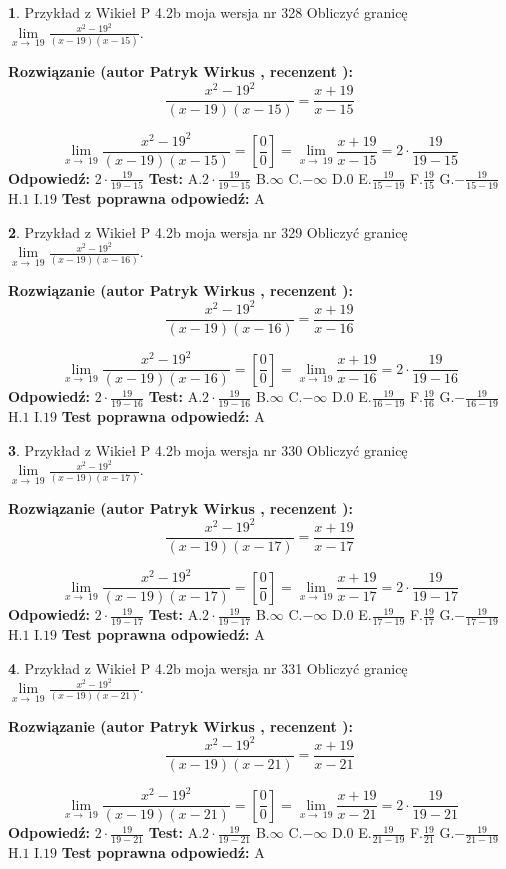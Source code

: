 \documentclass[12pt, a4paper]{article}
\theoremstyle{definition} %
\newtheorem{zad}{}
\newcommand{\zadStart}[1]{\begin{zad}#1\newline}
\newcommand{\zadStop}{\end{zad}}
\newcommand{\rozwStart}[2]{\noindent \textbf{Rozwiązanie (autor #1 , recenzent #2): }\newline}
\newcommand{\rozwStop}{\newline}
\newcommand{\odpStart}{\noindent \textbf{Odpowiedź:}\newline}
\newcommand{\odpStop}{\newline}
\newcommand{\testStart}{\noindent \textbf{Test:}\newline}
\newcommand{\testStop}{\newline}
\newcommand{\kluczStart}{\noindent \textbf{Test poprawna odpowiedź:}\newline}
\newcommand{\kluczStop}{\newline}
\begin{document}
\zadStart{Przykład z Wikieł P 4.2b moja wersja nr 328}
Obliczyć granicę $\lim\limits_{x\to\ 19}\frac{x^{2}-19^{2}}{(x-19)(x-15)}$.
\zadStop
\rozwStart{Patryk Wirkus}{}
$$\frac{x^{2}-19^{2}}{(x-19)(x-15)}=\frac{x+19}{x-15}$$

$$\lim\limits_{x\to\ 19}\frac{x^{2}-19^{2}}{(x-19)(x-15)}=[\frac{0}{0}]=\lim\limits_{x\to\ 19}\frac{x+19}{x-15}=2 \cdot \frac{19}{19-15}$$
\rozwStop
\odpStart
$2 \cdot \frac{19}{19-15}$
\odpStop
\testStart
A.$2 \cdot \frac{19}{19-15}$
B.$\infty$
C.$-\infty$
D.$0$
E.$\frac{19}{15-19}$
F.$\frac{19}{15}$
G.$-\frac{19}{15-19}$
H.$1$
I.$19$
\testStop
\kluczStart
A
\kluczStop



\zadStart{Przykład z Wikieł P 4.2b moja wersja nr 329}
Obliczyć granicę $\lim\limits_{x\to\ 19}\frac{x^{2}-19^{2}}{(x-19)(x-16)}$.
\zadStop
\rozwStart{Patryk Wirkus}{}
$$\frac{x^{2}-19^{2}}{(x-19)(x-16)}=\frac{x+19}{x-16}$$

$$\lim\limits_{x\to\ 19}\frac{x^{2}-19^{2}}{(x-19)(x-16)}=[\frac{0}{0}]=\lim\limits_{x\to\ 19}\frac{x+19}{x-16}=2 \cdot \frac{19}{19-16}$$
\rozwStop
\odpStart
$2 \cdot \frac{19}{19-16}$
\odpStop
\testStart
A.$2 \cdot \frac{19}{19-16}$
B.$\infty$
C.$-\infty$
D.$0$
E.$\frac{19}{16-19}$
F.$\frac{19}{16}$
G.$-\frac{19}{16-19}$
H.$1$
I.$19$
\testStop
\kluczStart
A
\kluczStop



\zadStart{Przykład z Wikieł P 4.2b moja wersja nr 330}
Obliczyć granicę $\lim\limits_{x\to\ 19}\frac{x^{2}-19^{2}}{(x-19)(x-17)}$.
\zadStop
\rozwStart{Patryk Wirkus}{}
$$\frac{x^{2}-19^{2}}{(x-19)(x-17)}=\frac{x+19}{x-17}$$

$$\lim\limits_{x\to\ 19}\frac{x^{2}-19^{2}}{(x-19)(x-17)}=[\frac{0}{0}]=\lim\limits_{x\to\ 19}\frac{x+19}{x-17}=2 \cdot \frac{19}{19-17}$$
\rozwStop
\odpStart
$2 \cdot \frac{19}{19-17}$
\odpStop
\testStart
A.$2 \cdot \frac{19}{19-17}$
B.$\infty$
C.$-\infty$
D.$0$
E.$\frac{19}{17-19}$
F.$\frac{19}{17}$
G.$-\frac{19}{17-19}$
H.$1$
I.$19$
\testStop
\kluczStart
A
\kluczStop



\zadStart{Przykład z Wikieł P 4.2b moja wersja nr 331}
Obliczyć granicę $\lim\limits_{x\to\ 19}\frac{x^{2}-19^{2}}{(x-19)(x-21)}$.
\zadStop
\rozwStart{Patryk Wirkus}{}
$$\frac{x^{2}-19^{2}}{(x-19)(x-21)}=\frac{x+19}{x-21}$$

$$\lim\limits_{x\to\ 19}\frac{x^{2}-19^{2}}{(x-19)(x-21)}=[\frac{0}{0}]=\lim\limits_{x\to\ 19}\frac{x+19}{x-21}=2 \cdot \frac{19}{19-21}$$
\rozwStop
\odpStart
$2 \cdot \frac{19}{19-21}$
\odpStop
\testStart
A.$2 \cdot \frac{19}{19-21}$
B.$\infty$
C.$-\infty$
D.$0$
E.$\frac{19}{21-19}$
F.$\frac{19}{21}$
G.$-\frac{19}{21-19}$
H.$1$
I.$19$
\testStop
\kluczStart
A
\kluczStop
\end{document}
